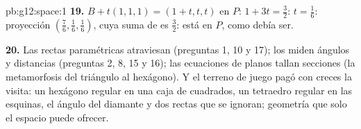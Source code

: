 \begin{solution}{pb:g12:space:1}
\textbf{19.} $B + t(1,1,1) = (1 + t, t, t)$ en $P$: $1 + 3t = \frac32$:
$t = \frac16$: proyección $\left(\frac76, \frac16, \frac16\right)$, cuya
suma de  es $\frac32$: está en $P$, como debía ser.

\textbf{20.} Las rectas paramétricas atraviesan (preguntas 1, 10 y 17); los
 miden ángulos y distancias (preguntas 2, 8, 15 y 16); las
ecuaciones de planos tallan secciones (la metamorfosis del triángulo al
hexágono). Y el terreno de juego pagó con creces la visita: un hexágono
regular en una caja de cuadrados, un tetraedro regular en las esquinas, el
ángulo del diamante y dos rectas que se ignoran; geometría que solo el
espacio puede ofrecer.
\end{solution}
